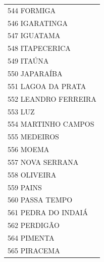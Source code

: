\documentclass{article}
\begin{document}
\begin{longtable}[c]{m{18cm}}
\multicolumn{1}{l}{ \hspace{2em} 544 FORMIGA } \\
\multicolumn{1}{l}{ \hspace{2em} 546 IGARATINGA } \\
\multicolumn{1}{l}{ \hspace{2em} 547 IGUATAMA } \\
\multicolumn{1}{l}{ \hspace{2em} 548 ITAPECERICA } \\
\multicolumn{1}{l}{ \hspace{2em} 549 ITAÚNA } \\
\multicolumn{1}{l}{ \hspace{2em} 550 JAPARAÍBA } \\
\multicolumn{1}{l}{ \hspace{2em} 551 LAGOA DA PRATA } \\
\multicolumn{1}{l}{ \hspace{2em} 552 LEANDRO FERREIRA } \\
\multicolumn{1}{l}{ \hspace{2em} 553 LUZ } \\
\multicolumn{1}{l}{ \hspace{2em} 554 MARTINHO CAMPOS } \\
\multicolumn{1}{l}{ \hspace{2em} 555 MEDEIROS } \\
\multicolumn{1}{l}{ \hspace{2em} 556 MOEMA } \\
\multicolumn{1}{l}{ \hspace{2em} 557 NOVA SERRANA } \\
\multicolumn{1}{l}{ \hspace{2em} 558 OLIVEIRA } \\
\multicolumn{1}{l}{ \hspace{2em} 559 PAINS } \\
\multicolumn{1}{l}{ \hspace{2em} 560 PASSA TEMPO } \\
\multicolumn{1}{l}{ \hspace{2em} 561 PEDRA DO INDAIÁ } \\
\multicolumn{1}{l}{ \hspace{2em} 562 PERDIGÃO } \\
\multicolumn{1}{l}{ \hspace{2em} 564 PIMENTA } \\
\multicolumn{1}{l}{ \hspace{2em} 565 PIRACEMA } \\

\end{longtable}
\end{document}
